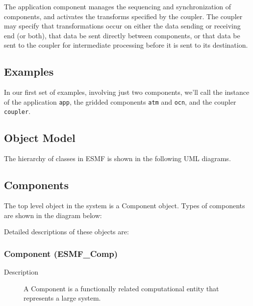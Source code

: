 The application component manages the sequencing and synchronization of
components, and activates the transforms specified by the coupler.  The
coupler may specify that transformations occur on either the data sending 
or receiving end (or both), that data be sent directly between components,
or that data be sent to the coupler for intermediate processing before 
it is sent to its destination.

\subsection{Examples}

In our first set of examples, involving just two components, we'll call 
the instance of the application {\tt app}, the gridded components {\tt atm} 
and {\tt ocn}, and the coupler {\tt coupler}.

\subsection{Object Model}

The hierarchy of classes in ESMF is shown in the following UML diagrams.  

\subsection{Components}

The top level object in the system is a Component object.
Types of components are shown in the diagram below:


Detailed descriptions of these objects are:

\subsubsection{Component (ESMF\_Comp)} 
\begin{description}
\item [Description] A Component is a functionally related computational entity that represents 
a large system.  
\end{description}

